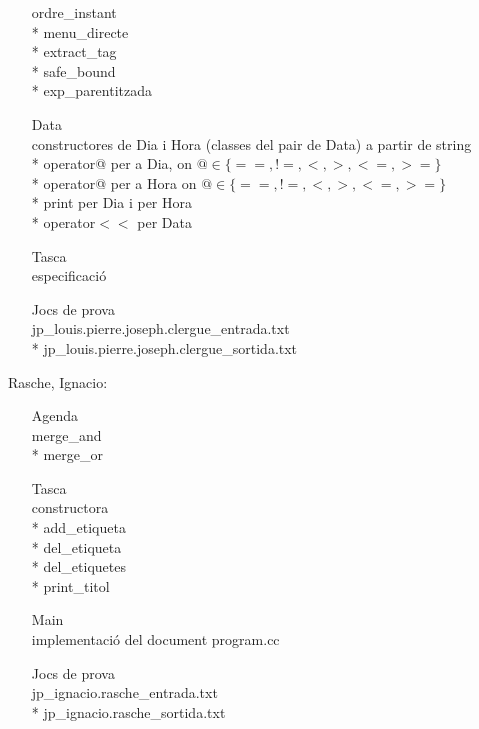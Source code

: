 \documentclass[a4paper,11pt]{article}
\begin{document}
\begin{description}
\begin{enumerate}
    ordre\_instant \\*
    menu\_directe \\*
    extract\_tag \\*
    safe\_bound \\*
    exp\_parentitzada
    \item[Data] \hfill \\
    constructores de Dia i Hora (classes del pair de Data) a partir de string \\*
    operator@ per a Dia, on $@ \in \{==, !=, <, >, <=, >=\}$ \\*
    operator@ per a Hora on $@ \in \{==, !=, <, >, <=, >=\}$ \\*
    print per Dia i per Hora \\*
    operator$<<$ per Data
    \item[Tasca] \hfill \\
    especificació
    \item[Jocs de prova] \hfill \\
    jp\_louis.pierre.joseph.clergue\_entrada.txt \\*
    jp\_louis.pierre.joseph.clergue\_sortida.txt
  \end{enumerate}
  \item \textsf{Rasche, Ignacio}:
  \begin{enumerate}
    \item[Agenda] \hfill \\
    merge\_and \\*
    merge\_or
    \item[Tasca] \hfill \\
    constructora \\*
    add\_etiqueta \\*
    del\_etiqueta \\*
    del\_etiquetes \\*
    print\_titol
    \item[Main] \hfill \\
    implementació del document program.cc
    \item[Jocs de prova] \hfill \\
    jp\_ignacio.rasche\_entrada.txt \\*
    jp\_ignacio.rasche\_sortida.txt    
  \end{enumerate}
\end{description}
\end{document}
